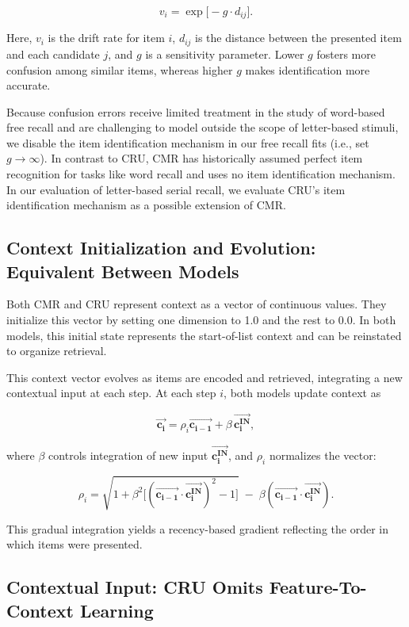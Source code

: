 \documentclass[
  letterpaper,
  DIV=11,
  numbers=noendperiod]{scrartcl}
\begin{document}
\[
v_i = \exp \bigl[-g \cdot d_{ij}\bigr].
\]

Here, \(v_i\) is the drift rate for item \(i\), \(d_{ij}\) is the
distance between the presented item and each candidate \(j\), and \(g\)
is a sensitivity parameter. Lower \(g\) fosters more confusion among
similar items, whereas higher \(g\) makes identification more accurate.

Because confusion errors receive limited treatment in the study of
word-based free recall and are challenging to model outside the scope of
letter-based stimuli, we disable the item identification mechanism in
our free recall fits (i.e., set \(g \rightarrow \infty\)). In contrast
to CRU, CMR has historically assumed perfect item recognition for tasks
like word recall and uses no item identification mechanism. In our
evaluation of letter-based serial recall, we evaluate CRU's item
identification mechanism as a possible extension of CMR.

\subsection{Context Initialization and Evolution: Equivalent Between
Models}\label{context-initialization-and-evolution-equivalent-between-models}

Both CMR and CRU represent context as a vector of continuous values.
They initialize this vector by setting one dimension to 1.0 and the rest
to 0.0. In both models, this initial state represents the start-of-list
context and can be reinstated to organize retrieval.

This context vector evolves as items are encoded and retrieved,
integrating a new contextual input at each step. At each step \(i\),
both models update context as

\[
\mathbf{\vec{c_i}} = \rho_i \mathbf{\vec{c_{i-1}}} + \beta \, \mathbf{\vec{c_{i}^{\text{IN}}}},
\]

where \(\beta\) controls integration of new input
\(\mathbf{\vec{c_i^{IN}}}\), and \(\rho_i\) normalizes the vector:

\[
\rho_i = \sqrt{1 + \beta^2\bigl[(\mathbf{\vec{c_{i-1}}} \cdot \mathbf{\vec{c^{IN}_i}})^2 - 1\bigr]} \;-\;\beta(\mathbf{\vec{c_{i-1}}} \cdot \mathbf{\vec{c^{IN}_i}}).
\]

This gradual integration yields a recency-based gradient reflecting the
order in which items were presented.

\subsection{Contextual Input: CRU Omits Feature-To-Context
Learning}\label{contextual-input-cru-omits-feature-to-context-learning}
\end{document}

